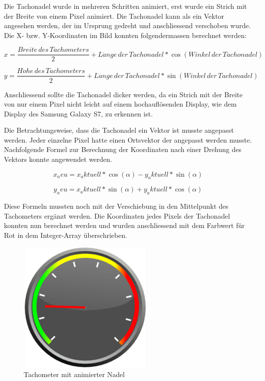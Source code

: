 Die Tachonadel wurde in mehreren Schritten animiert, erst wurde ein Strich mit der Breite von einem Pixel animiert. Die Tachonadel kann als ein Vektor angesehen werden, der im Ursprung gedreht und anschliessend verschoben wurde. Die X- bzw. Y-Koordinaten im Bild konnten folgendermassen berechnet werden:

\begin{equation}
	x = \frac{Breite\, des\, Tachometers}{2} + L\ddot{a}nge\, der\, Tachonadel * \cos(Winkel\, der\, Tachonadel)
\end{equation}

\begin{equation}
	y = \frac{H\ddot{o}he\, des\, Tachometers}{2} + L\ddot{a}nge\, der\, Tachonadel * \sin(Winkel\, der\, Tachonadel)
\end{equation}

Anschliessend sollte die Tachonadel dicker werden, da ein Strich mit der Breite von nur einem Pixel nicht leicht auf einem hochauflösenden Display, wie dem Display des Samsung Galaxy S7, zu erkennen ist.

Die Betrachtungsweise, dass die Tachonadel ein Vektor ist musste angepasst werden. Jeder einzelne Pixel hatte einen Ortsvektor der angepasst werden musste. Nachfolgende Formel zur Berechnung der Koordinaten nach einer Drehung des Vektors konnte angewendet werden.

\begin{equation}
	x_neu = x_aktuell * \cos(\alpha) - y_aktuell * \sin(\alpha)
\end{equation}

\begin{equation}
	y_neu = x_aktuell * \sin(\alpha) + y_aktuell * \cos(\alpha)
\end{equation}

Diese Formeln mussten noch mit der Verschiebung in den Mittelpunkt des Tachometers ergänzt werden. Die Koordinaten jedes Pixels der Tachonadel konnten nun berechnet werden und wurden anschliessend mit dem Farbwert für Rot in dem Integer-Array überschrieben.

\begin{figure}[ht]
    \includegraphics{3Vorgehen/imag/tachometer_mit_nadel.png}
    \caption{Tachometer mit animierter Nadel}
	\label{tachometer_mit_nadel} 
\end{figure}

